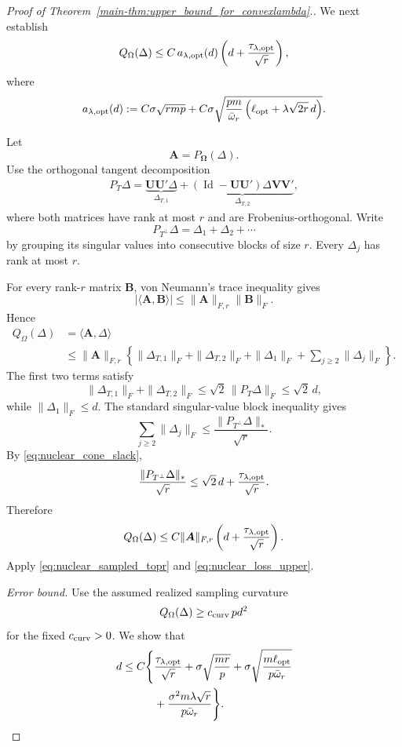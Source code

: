 \documentclass[numsec,webpdf,modern,large,namedate]{oup-authoring-template}
\theoremstyle{plain}
\theoremstyle{remark}
\newcommand{\bOmega}{\bm{\Omega}}
\newcommand{\U}{\bm{U}}
\newcommand{\V}{\bm{V}}
\newif\ifmarkchanges
\newenvironment{revision}{\begingroup\ifmarkchanges\color{red}\fi}{\endgroup}
\begin{document}
\begin{revision}
\begin{proof}[Proof of Theorem~\ref{main-thm:upper_bound_for_convexlambda}.]
We next establish
\begin{align}
 Q_\Omega(\Delta)
 \le
 C\,
 a_{\lambda,\rm opt}(d)
 \left(
 d+\frac{\tau_{\lambda,\rm opt}}{\sqrt r}
 \right),
 \label{eq:nuclear_Q_upper}
\end{align}
where
\begin{align}
 a_{\lambda,\rm opt}(d)
 :=
 C\sigma\sqrt{rmp}
 +
 C\sigma
 \sqrt{
 \frac{pm}{\bar\omega_r}
 \left(
 \ell_{\rm opt}
 +\lambda\sqrt{2r}\,d
 \right)
 }.
 \label{eq:nuclear_a_lambda}
\end{align}

Let
\[
 \bm A=P_{\bOmega}(\Delta).
\]
Use the orthogonal tangent decomposition
\begin{align}
\label{eq:nuclear_tangent_split}
 P_T\Delta
 =
 \underbrace{
 \U\U'\Delta
 }_{\Delta_{T,1}}
 +
 \underbrace{
 (\operatorname{Id}-\U\U')\Delta\V\V'
 }_{\Delta_{T,2}},
\end{align}
where both matrices have rank at most $r$ and are Frobenius-orthogonal.
Write
\[
 P_{T^\perp}\Delta
 =
 \Delta_1+\Delta_2+\cdots
\]
by grouping its singular values into consecutive blocks of size $r$.
Every $\Delta_j$ has rank at most $r$.

For every rank-$r$ matrix $\bm B$, von Neumann's trace inequality gives
\[
 |\langle\bm A,\bm B\rangle|
 \le
 \|\bm A\|_{F,r}\|\bm B\|_F.
\]
Hence
\begin{align*}
 Q_\Omega(\Delta)
 &=
 \langle\bm A,\Delta\rangle\\
 &\le
 \|\bm A\|_{F,r}
 \left\{
 \|\Delta_{T,1}\|_F
 +
 \|\Delta_{T,2}\|_F
 +
 \|\Delta_1\|_F
 +
 \sum_{j\ge2}\|\Delta_j\|_F
 \right\}.
\end{align*}
The first two terms satisfy
\[
 \|\Delta_{T,1}\|_F+\|\Delta_{T,2}\|_F
 \le
 \sqrt2\,\|P_T\Delta\|_F
 \le
 \sqrt2\,d,
\]
while $\|\Delta_1\|_F\le d$.  The standard singular-value block inequality
gives
\[
 \sum_{j\ge2}\|\Delta_j\|_F
 \le
 \frac{
 \|P_{T^\perp}\Delta\|_*
 }{\sqrt r}.
\]
By \eqref{eq:nuclear_cone_slack},
\[
 \frac{
 \|P_{T^\perp}\Delta\|_*
 }{\sqrt r}
 \le
 \sqrt2\,d+
 \frac{\tau_{\lambda,\rm opt}}{\sqrt r}.
\]
Therefore
\begin{align}
\label{eq:nuclear_energy_topr_intermediate}
 Q_\Omega(\Delta)
 \le
 C\|\bm A\|_{F,r}
 \left(
 d+\frac{\tau_{\lambda,\rm opt}}{\sqrt r}
 \right).
\end{align}
Apply \eqref{eq:nuclear_sampled_topr} and
\eqref{eq:nuclear_loss_upper}.

\textit{Error bound.} Use the assumed realized sampling curvature
\begin{align}
\label{eq:nuclear_realized_curvature}
 Q_\Omega(\Delta)
 \ge
 c_{\rm curv}\,p d^2
\end{align}
for the fixed $c_{\rm curv}>0$. We show that
\begin{align}
\label{eq:nuclear_quantitative_rate}
 d
 \le
 C\Bigg\{&
 \frac{\tau_{\lambda,\rm opt}}{\sqrt r}
 +
 \sigma\sqrt{\frac{mr}{p}}
 +
 \sigma
 \sqrt{
 \frac{m\ell_{\rm opt}}
 {p\bar\omega_r}
 }
 \nonumber\\
 &+
 \frac{
 \sigma^2m\lambda\sqrt r
 }{
 p\bar\omega_r
 }
 \Bigg\}.
\end{align}


\end{proof}
\end{revision}
\end{document}
